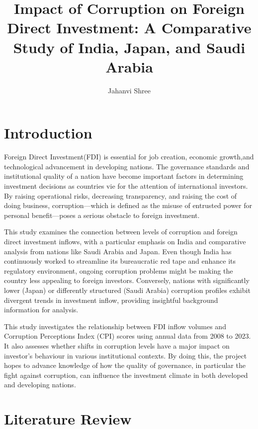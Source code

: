 \documentclass{article}
\title{Impact of Corruption on Foreign Direct Investment: A Comparative Study of India, Japan,  and Saudi Arabia}
\author{Jahanvi Shree}
\begin{document}
\maketitle

\begin{abstract}

\end{abstract}

\section{Introduction}
Foreign Direct Investment(FDI) is essential  for job creation, economic growth,and technological advancement in developing nations. The governance standards and institutional quality of a nation have become important factors in determining investment decisions as countries vie for the attention of international investors. By raising operational risks, decreasing transparency, and raising the cost of doing business, corruption—which is defined as the misuse of entrusted power for personal benefit—poses a serious obstacle to foreign investment.


This study examines the connection between levels of corruption and foreign direct investment inflows, with a particular emphasis on India and comparative analysis from nations like Saudi Arabia and Japan. Even though India has continuously worked to streamline its bureaucratic red tape and enhance its regulatory environment, ongoing corruption problems might be making the country less appealing to foreign investors. Conversely, nations with significantly lower (Japan) or differently structured (Saudi Arabia) corruption profiles exhibit divergent trends in investment inflow, providing insightful background information for analysis.


This study investigates the relationship between FDI inflow volumes and Corruption Perceptions Index (CPI) scores using annual data from 2008 to 2023. It also assesses whether shifts in corruption levels have a major impact on investor's behaviour in various institutional contexts. By doing this, the project hopes to advance knowledge of how the quality of governance, in particular the fight against corruption, can influence the investment climate in both developed and developing nations.


\section{Literature Review}
\end{document}
